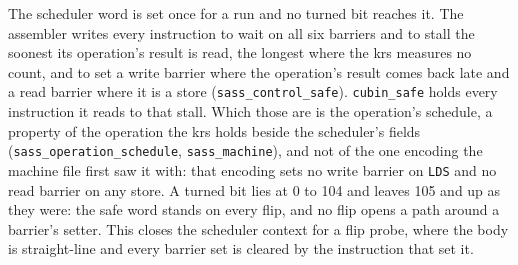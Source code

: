 The scheduler word is set once for a run and no turned bit reaches it. The assembler writes every instruction to wait on all six barriers and to stall the soonest its operation's result is read, the longest where the krs measures no count, and to set a write barrier where the operation's result comes back late and a read barrier where it is a store (\texttt{sass\_\allowbreak{}control\_\allowbreak{}safe}). \texttt{cubin\_\allowbreak{}safe} holds every instruction it reads to that stall. Which those are is the operation's schedule, a property of the operation the krs holds beside the scheduler's fields (\texttt{sass\_\allowbreak{}operation\_\allowbreak{}schedule}, \texttt{sass\_\allowbreak{}machine}), and not of the one encoding the machine file first saw it with: that encoding sets no write barrier on \texttt{LDS} and no read barrier on any store. A turned bit lies at 0 to 104 and leaves 105 and up as they were: the safe word stands on every flip, and no flip opens a path around a barrier's setter. This closes the scheduler context for a flip probe, where the body is straight-line and every barrier set is cleared by the instruction that set it.

